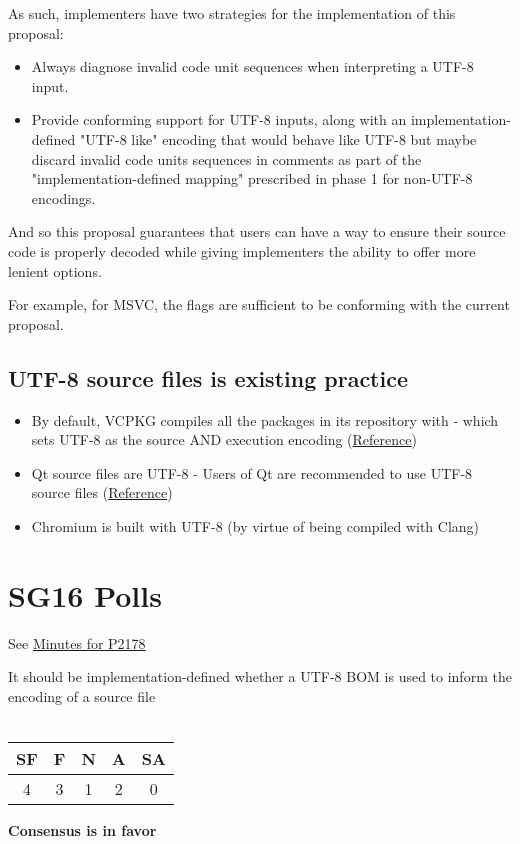 \documentclass{wg21}
\begin{document}
As such, implementers have two strategies for the implementation of this proposal:

\begin{itemize}
\item Always diagnose invalid code unit sequences when interpreting a UTF-8 input.
\item Provide conforming support for UTF-8 inputs, along with an implementation-defined "UTF-8 like" encoding that would behave like UTF-8 but maybe discard
invalid code units sequences in comments as part of the "implementation-defined mapping" prescribed in phase 1 for non-UTF-8 encodings.
\end{itemize}

And so this proposal guarantees that users can have a way to ensure their source code is properly decoded while giving implementers
the ability to offer more lenient options.

For example, for MSVC, the flags  are sufficient to be conforming with the current proposal.


\subsection{UTF-8 source files is existing practice}

\begin{itemize}
    \item By default, VCPKG compiles all the packages in its repository with  - which sets UTF-8 as the source AND execution encoding (\href{https://github.com/vicroms/vcpkg/blob/master/scripts/toolchains/windows.cmake#L16}{Reference})
    \item Qt source files are UTF-8 - Users of Qt are recommended to use UTF-8 source files (\href{https://wiki.qt.io/Strings_and_encodings_in_Qt}{Reference})
    \item Chromium is built with UTF-8 (by virtue of being compiled with Clang)
\end{itemize}
\pagebreak
\section{SG16 Polls}

See \href{https://github.com/sg16-unicode/sg16-meetings/blob/master/README-2020.md}{Minutes for P2178}

\begin{quoteblock}
It should be implementation-defined whether a UTF-8 BOM is used to inform the encoding of a source file
\\\\    
\begin{tabular}{|c|c|c|c|c|}
\hline
SF & F & N & A & SA \\
\hline
4 & 3 & 1 & 2 & 0 \\
\hline
\end{tabular}

\textbf{Consensus is in favor}
\end{quoteblock}
\end{document}
